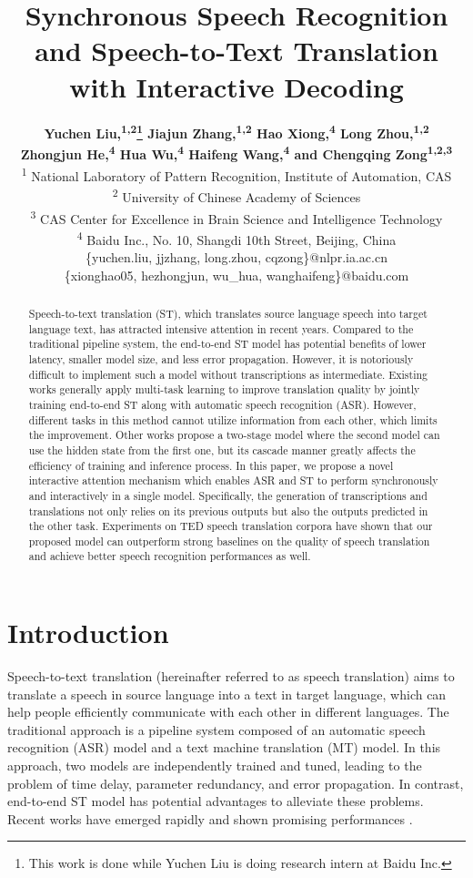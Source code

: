 \documentclass[letterpaper]{article} %
\title{Synchronous Speech Recognition and Speech-to-Text Translation \\ with Interactive Decoding}
\author{
	\Large \textbf{
		Yuchen Liu,\textsuperscript{\rm 1,2}\thanks{This work is done while Yuchen Liu is doing research intern at Baidu Inc.} 
		Jiajun Zhang,\textsuperscript{\rm 1,2} 
		Hao Xiong,\textsuperscript{\rm 4} 
		Long Zhou,\textsuperscript{\rm 1,2}} \\ 
	\Large \textbf{
		Zhongjun He,\textsuperscript{\rm 4} 
		Hua Wu,\textsuperscript{\rm 4} 
		Haifeng Wang,\textsuperscript{\rm 4} 
		and Chengqing Zong\textsuperscript{\rm 1,2,3}}\\ 
	\textsuperscript{\rm 1} National Laboratory of Pattern Recognition, Institute of Automation, CAS\\
	\textsuperscript{\rm 2} University of Chinese Academy of Sciences\\ 
	\textsuperscript{\rm 3} CAS Center for Excellence in Brain Science and Intelligence Technology\\
	\textsuperscript{\rm 4} Baidu Inc., No. 10, Shangdi 10th Street, Beijing, China\\
	\{yuchen.liu, jjzhang, long.zhou, cqzong\}@nlpr.ia.ac.cn\\
	\{xionghao05, hezhongjun, wu\_hua, wanghaifeng\}@baidu.com
}
\begin{document}
\maketitle

\begin{abstract}
Speech-to-text translation (ST), which translates source language speech into target language text, has attracted intensive attention in recent years. 
Compared to the traditional pipeline system, the end-to-end ST model has potential benefits of lower latency, smaller model size, and less error propagation. 
However, it is notoriously difficult to implement such a model without transcriptions as intermediate.
Existing works generally apply multi-task learning to improve translation quality by jointly training end-to-end ST along with automatic speech recognition (ASR). However, different tasks in this method cannot utilize information from each other, which limits the improvement. Other works propose a two-stage model where the second model can use the hidden state from the first one, but its cascade manner greatly affects the efficiency of training and inference process.
In this paper, we propose a novel interactive attention mechanism which enables ASR and ST to perform synchronously and interactively in a single model.
Specifically, the generation of transcriptions and translations not only relies on its previous outputs but also the outputs predicted in the other task. Experiments on TED speech translation corpora have shown that our proposed model can outperform strong baselines on the quality of speech translation and achieve better speech recognition performances as well.
\end{abstract}

\section{Introduction}
\label{introduction}
Speech-to-text translation (hereinafter referred to as speech translation)
aims to translate a speech in source language into a text in target language, which can help people efficiently communicate with each other in different languages.
The traditional approach is a pipeline system composed of an automatic speech recognition (ASR) model and a text machine translation (MT) model. 
In this approach, two models are independently trained and tuned, leading to the problem of time delay, parameter redundancy, and error propagation.
In contrast, end-to-end ST model has potential advantages to alleviate these problems. Recent works have  emerged rapidly and shown promising performances 
\cite{weiss2017sequence,berard2018end,bansal2018pre,jia2019leveraging,sperber2019attention}.
\end{document}
